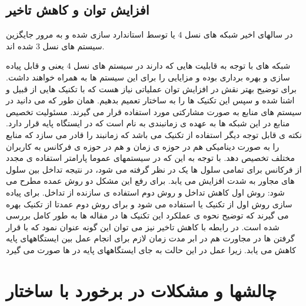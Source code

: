\subsection{افزایش توان و کاهش تاخیر}
در سالهای اخیر شبکه های نسل $4$  یا  توسط 
استاندارد سازی شده و به مرور جایگزین سیستم های نسل $3$
 شده اند.
 
  شبکه های  
 با توجه به قابلیت هایی
که دارند در سیستم های نسل $4$ یعنی  و 
قابل پیاده سازی و بهره برداری بوده و مزایایی را برای این
سیستم ها به همراه خواهند داشت. برای توضیح بهتر نقش
    در افزایش توان عملیاتی نیاز هست که با تکنیک
هایی از قبیل   و   اشنا شده و سپس این
تکنیک ها را به ساختار  تعمیم بدهیم.
همان طور که می دانید در سیستم های  منابع به
صورت مشارکتی مورد استفاده قرار می گیرند. مسئولیت
تخصیص منابع در این شبکه ها به عهده ی زمانبندی 
به نام   است که در ایستگاه پایه قرار دارد. نکته ی
قابل توجه دیگر استفاده از تکنیک  می باشد که
زمانبند را قادر می سازد که منابع را به صورت دینامیکی
هم در حوزه ی زمان و هم در حوزه ی فرکانس به کاربران
مختلف تخصیص دهد.
با توجه به این که در سیستمهای  عموما پارامتر استفاده
ی مجدد از فرکانس برای تمامی سلول ها یک در نظر
گرفته می شود، در نتیجه تداخل بین سلول های مجاور
به شدت افزایش می یابد. برای رفع این مشکل دو روش
عمده مطرح می شود: روش اول کاهش تداخل و روش دوم
استفاده ی سازنده از تداخل. برای پیاده سازی روش اول
از تکنیک  یا  استفاده می شود و برای روش
دوم عمدتا از تکنیک  بهره می گیرند که توضیح
نحوه ی عملکرد این تکنیک ها در مقاله ها به طور کامل
بررسی شده است. در رابطه با کاهش تاخیر نیز می توان
این گونه عنوان نمود که با قرار گرفتن  ها در مجاورت
هم در ابر مدت زمان لازم برای انجام عمل  بین
ایستگاههای پایه کاهش می یابد. زیرا عمل در
این حالت به جای ایستگاههای پایه در  ها صورت
می گیرد
\section{چالشها و مشکلات در برخورد با ساختار  }

